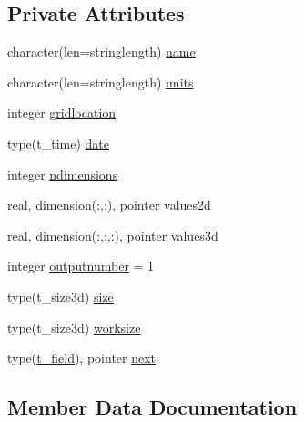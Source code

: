 \subsection*{Private Attributes}
\begin{DoxyCompactItemize}
\item 
character(len=stringlength) \mbox{\hyperlink{structmodulemercatorformat_1_1t__field_a32491feff1780909f67774c3e719e5b5}{name}}
\item 
character(len=stringlength) \mbox{\hyperlink{structmodulemercatorformat_1_1t__field_a3b47d62a455de0e8c1ea03143656cc05}{units}}
\item 
integer \mbox{\hyperlink{structmodulemercatorformat_1_1t__field_aedd5690ca4987ce83ddaadd98fd27a51}{gridlocation}}
\item 
type(t\+\_\+time) \mbox{\hyperlink{structmodulemercatorformat_1_1t__field_aeb974032efc9432ee6f138ebffb0d68c}{date}}
\item 
integer \mbox{\hyperlink{structmodulemercatorformat_1_1t__field_a780b89737cbbd37d171ff24e99f83a92}{ndimensions}}
\item 
real, dimension(\+:,\+:), pointer \mbox{\hyperlink{structmodulemercatorformat_1_1t__field_ac41d95abe161f4f708a2328d53b76ace}{values2d}}
\item 
real, dimension(\+:,\+:,\+:), pointer \mbox{\hyperlink{structmodulemercatorformat_1_1t__field_a2090faf23bd178ff777be1265d93d7af}{values3d}}
\item 
integer \mbox{\hyperlink{structmodulemercatorformat_1_1t__field_a2bd7246ab72b2a533cc2b7779d5380a0}{outputnumber}} = 1
\item 
type(t\+\_\+size3d) \mbox{\hyperlink{structmodulemercatorformat_1_1t__field_a9a294257e4b716d846ed8eb0cfef5ea1}{size}}
\item 
type(t\+\_\+size3d) \mbox{\hyperlink{structmodulemercatorformat_1_1t__field_a98c451d8fddc4b51cad3fa44899b6f3a}{worksize}}
\item 
type(\mbox{\hyperlink{structmodulemercatorformat_1_1t__field}{t\+\_\+field}}), pointer \mbox{\hyperlink{structmodulemercatorformat_1_1t__field_a64eedc7609eb2da781487b85dafa3225}{next}}
\end{DoxyCompactItemize}


\subsection{Member Data Documentation}
\mbox{\label{structmodulemercatorformat_1_1t__field_aeb974032efc9432ee6f138ebffb0d68c}} 
